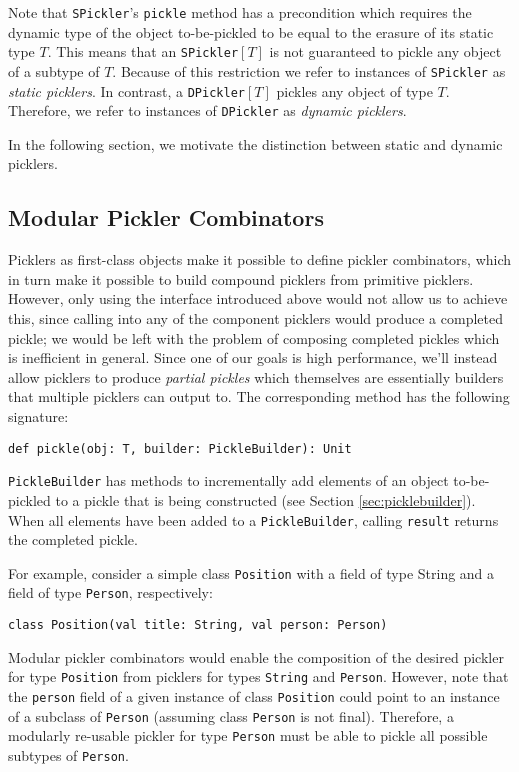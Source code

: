 \documentclass[preprint,10pt]{sigplanconf}
\theoremstyle{definition}
\newcommand{\term}[1]{\mbox{\texttt{#1}}}
\begin{document}
Note that \term{SPickler}'s \term{pickle} method has a precondition which
requires the dynamic type of the object to-be-pickled to be equal to the
erasure of its static type $T$. This means that an \term{SPickler}$[T]$ is not
guaranteed to pickle any object of a subtype of $T$. Because of this
restriction we refer to instances of \term{SPickler} as {\em static picklers}.
In contrast, a \term{DPickler}$[T]$ pickles any object of type $T$. Therefore,
we refer to instances of \term{DPickler} as {\em dynamic picklers}.

In the following section, we motivate the distinction between static and
dynamic picklers.

\subsection{Modular Pickler Combinators}

Picklers as first-class objects make it possible to define pickler
combinators, which in turn make it possible to build compound picklers from
primitive picklers. However, only using the interface introduced above would
not allow us to achieve this, since calling into any of the component picklers
would produce a completed pickle; we would be left with the problem of
composing completed pickles which is inefficient in general. Since one of our
goals is high performance, we'll instead allow picklers to produce {\em
partial pickles} which themselves are essentially builders \cite{Gamma1995}
that multiple picklers can output to. The corresponding method has the
following signature:

\begin{lstlisting}
def pickle(obj: T, builder: PickleBuilder): Unit
\end{lstlisting}

\verb|PickleBuilder| has methods to incrementally add elements of an object
to-be-pickled to a pickle that is being constructed (see Section
\ref{sec:picklebuilder}). When all elements have been added to a
\verb|PickleBuilder|, calling \verb|result| returns the completed pickle.

For example, consider a simple class \verb|Position| with a field of type
String and a field of type \term{Person}, respectively:

\begin{lstlisting}
class Position(val title: String, val person: Person)
\end{lstlisting}

Modular pickler combinators would enable the composition of the desired
pickler for type \term{Position} from picklers for types \term{String} and
\term{Person}. However, note that the \term{person} field of a given instance
of class \term{Position} could point to an instance of a subclass of
\term{Person} (assuming class \term{Person} is not final). Therefore, a
modularly re-usable pickler for type \term{Person} must be able to pickle all
possible subtypes of \term{Person}.
\end{document}
